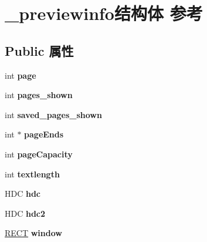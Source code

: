 \hypertarget{struct__previewinfo}{}\section{\+\_\+previewinfo结构体 参考}
\label{struct__previewinfo}
\subsection*{Public 属性}
\begin{DoxyCompactItemize}
\item 
\mbox{\label{struct__previewinfo_aae0250a4fc6c946538f09f3d97da221e}} 
int {\bfseries page}
\item 
\mbox{\label{struct__previewinfo_a3abcf193d9afda8c9346b0ac588adb17}} 
int {\bfseries pages\+\_\+shown}
\item 
\mbox{\label{struct__previewinfo_a631f478f9d4f278a5b24d589d4810a48}} 
int {\bfseries saved\+\_\+pages\+\_\+shown}
\item 
\mbox{\label{struct__previewinfo_a3fd508bf209ebab1f7af0f74df73e3eb}} 
int $\ast$ {\bfseries page\+Ends}
\item 
\mbox{\label{struct__previewinfo_a3d98dea88e6470800ffe6f5b3f0a1800}} 
int {\bfseries page\+Capacity}
\item 
\mbox{\label{struct__previewinfo_af03809751bf3629ee3de62b6704b8722}} 
int {\bfseries textlength}
\item 
\mbox{\label{struct__previewinfo_a5b839575b55b128b7453433ba9e71ead}} 
H\+DC {\bfseries hdc}
\item 
\mbox{\label{struct__previewinfo_a3c6af1e83ec5865752e78e670449345f}} 
H\+DC {\bfseries hdc2}
\item 
\mbox{\label{struct__previewinfo_afe31a235e65957fc8394c3bb25d7fc60}} 
\hyperlink{structtag_r_e_c_t}{R\+E\+CT} {\bfseries window}
\item 
\mbox{\label{struct__previewinfo_accf45ccc2727f4c163251f959a349d35}} 

\end{DoxyCompactItemize}
